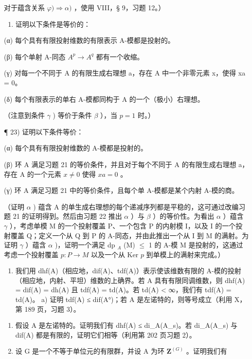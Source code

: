 对于蕴含关系 \(\varphi) \Rightarrow \alpha)\) ，使用 VIII，§ 9，习题 12。）

\begin{enumerate}
\def\labelenumi{\arabic{enumi})}
\setcounter{enumi}{21}
\tightlist
\item
  证明以下条件是等价的：
\end{enumerate}

(α) 每个具有有限投射维数的有限表示 A-模都是投射的。

(β) 每个单射 A-同态 \(A^{p} \rightarrow A^{q}\) 都有一个收缩。

(γ) 对每一个不同于 A 的有限生成右理想 a，存在 A 中一个非零元素 x，使得 xa = 0。

(δ) 每个有限表示的单右 A-模都同构于 A 的一个（极小）右理想。

（注意到条件 \(\gamma\) ) 等价于条件 \(\beta\) ），当 \(p = 1\) 时。）

¶ 23) 证明以下条件等价：

(α) 每个具有有限投射维数的 A-模都是投射的。

(β) 环 A 满足习题 21 的等价条件，并且对于每个不同于 A 的有限生成右理想 a，存在 A 的一个元素 \(x \neq 0\) 使得 \(xa = 0\) 。

(γ) 环 A 满足习题 21 中的等价条件，且每个单 A-模都是某个内射 A-模的商。

（证明 \(\alpha\) ) 蕴含 A 的单生成右理想的每个递减序列都是平稳的，这可通过改编习题 21 的证明得到。然后由习题 22 推出 \(\alpha\) ）与 \(\beta\) ）的等价性。为看出 \(\alpha\) ）蕴含 \(\gamma\) ），考虑单模 M 的一个投射覆盖 P、一个包含 P 的内射模 I，以及 I 的一个投射覆盖 Q；定义一个从 Q 到 P 的 A-同态，并由此推出一个从 I 到 M 的满射。为证明 \(\gamma\) ）蕴含 \(\alpha\) )，证明一个满足 dp \(_{A}\) (M) \(\leqslant\) 1 的 A-模 M 是投射的，这通过考虑一个投射覆盖 \(p: P \to M\) 以及一个从 Ker \(p\) 到单模上的满射来完成。）

\begin{enumerate}
\def\labelenumi{\arabic{enumi})}
\setcounter{enumi}{23}
\tightlist
\item
  我们用 dhf(A)（相应地，dif(A)、tdf(A)）表示使该维数有限的 A-模的投射（相应地，内射、平坦）维数的上确界。若 A 具有有限同调维数，则 dhf(A) = dif(A) = dh(A) 且 tdf(A) = td(A)。若 td(A) \textless{} ∞，我们有 tdf(A) = td(A)。 a) 证明 tdf(A) ≤ dif(A°)；若 A 是左诺特的，则等号成立（利用 X，第 189 页，习题 3）。
\end{enumerate}

\begin{enumerate}
\def\labelenumi{\alph{enumi})}
\setcounter{enumi}{1}
\item
  假设 A 是左诺特的。证明我们有 dhf(A) ≤ di\_A(A\_s)。若 di\_A(A\_s) 与 dif(A) 都是有限的，证明它们相等（利用第 202 页习题 2）。
\item
  设 G 是一个不等于单位元的有限群，并设 A 为环 \(\mathbf{Z}^{(G)}\) 。证明我们有
\end{enumerate}

